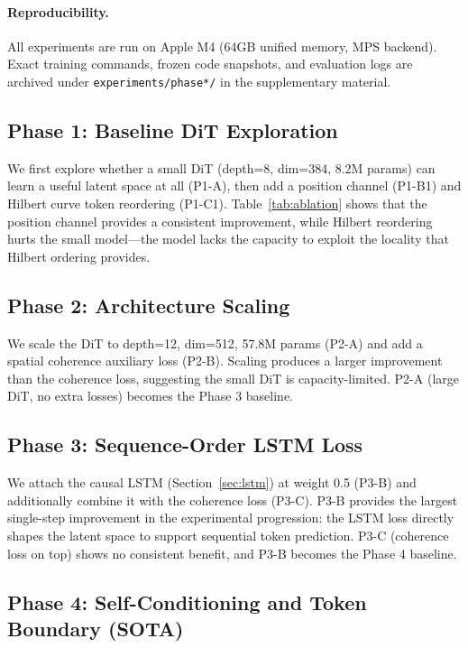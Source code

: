 \documentclass[11pt,a4paper]{article}
\begin{document}
\paragraph{Reproducibility.}
All experiments are run on Apple M4 (64GB unified memory, MPS backend).
Exact training commands, frozen code snapshots, and evaluation logs are archived under
\texttt{experiments/phase*/} in the supplementary material.

\subsection{Phase 1: Baseline DiT Exploration}
\label{sec:p1}

We first explore whether a small DiT (depth=8, dim=384, 8.2M params) can learn a
useful latent space at all (P1-A), then add a position channel (P1-B1) and Hilbert
curve token reordering (P1-C1).
Table~\ref{tab:ablation} shows that the position channel provides a consistent
improvement, while Hilbert reordering hurts the small model---the model lacks the
capacity to exploit the locality that Hilbert ordering provides.

\subsection{Phase 2: Architecture Scaling}
\label{sec:p2}

We scale the DiT to depth=12, dim=512, 57.8M params (P2-A) and add a spatial
coherence auxiliary loss (P2-B). Scaling produces a larger improvement than the
coherence loss, suggesting the small DiT is capacity-limited.
P2-A (large DiT, no extra losses) becomes the Phase 3 baseline.

\subsection{Phase 3: Sequence-Order LSTM Loss}
\label{sec:p3}

We attach the causal LSTM (Section~\ref{sec:lstm}) at weight 0.5 (P3-B) and
additionally combine it with the coherence loss (P3-C).
P3-B provides the largest single-step improvement in the experimental progression:
the LSTM loss directly shapes the latent space to support sequential token prediction.
P3-C (coherence loss on top) shows no consistent benefit, and P3-B becomes the Phase 4
baseline.

\subsection{Phase 4: Self-Conditioning and Token Boundary (SOTA)}
\label{sec:p4}
\end{document}

